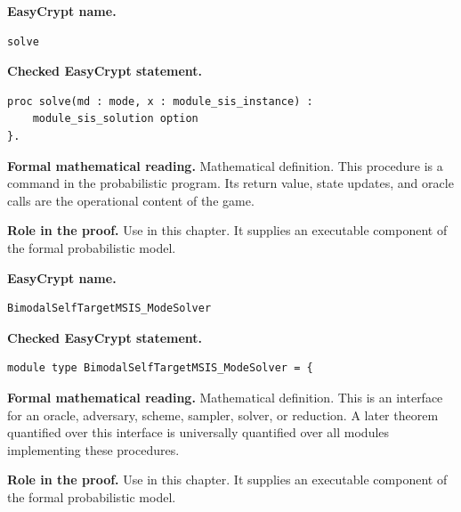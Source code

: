 \begin{formaldefinition}
\noindent\textbf{EasyCrypt name.}
\begin{lstlisting}[language=EasyCrypt,basicstyle=\ttfamily\scriptsize]
solve
\end{lstlisting}
\noindent\textbf{Checked EasyCrypt statement.}
\begin{lstlisting}[language=EasyCrypt,basicstyle=\ttfamily\scriptsize]
proc solve(md : mode, x : module_sis_instance) :
    module_sis_solution option
}.
\end{lstlisting}
\noindent\textbf{Formal mathematical reading.}
Mathematical definition. This procedure is a command in the probabilistic program.  Its return value, state updates, and oracle calls are the operational content of the game.

\noindent\textbf{Role in the proof.}
Use in this chapter. It supplies an executable component of the formal probabilistic model.

\end{formaldefinition}

\begin{formaldefinition}
\noindent\textbf{EasyCrypt name.}
\begin{lstlisting}[language=EasyCrypt,basicstyle=\ttfamily\scriptsize]
BimodalSelfTargetMSIS_ModeSolver
\end{lstlisting}
\noindent\textbf{Checked EasyCrypt statement.}
\begin{lstlisting}[language=EasyCrypt,basicstyle=\ttfamily\scriptsize]
module type BimodalSelfTargetMSIS_ModeSolver = {
\end{lstlisting}
\noindent\textbf{Formal mathematical reading.}
Mathematical definition. This is an interface for an oracle, adversary, scheme, sampler, solver, or reduction.  A later theorem quantified over this interface is universally quantified over all modules implementing these procedures.

\noindent\textbf{Role in the proof.}
Use in this chapter. It supplies an executable component of the formal probabilistic model.

\end{formaldefinition}

